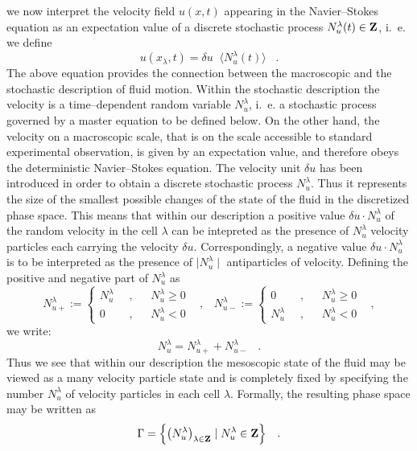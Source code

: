 we now
interpret the
velocity field $u(x,t)$ appearing in the Navier--Stokes equation
as an expectation value of a discrete stochastic process
$N_u^{\lambda}(t) \in {\bf{Z}}$, i.~e. we define
\begin{equation}
\label{EXPEC}
u(x_{\lambda},t) =
\delta u \;\; \langle N_u^{\lambda}(t) \rangle \;\;\; .
\end{equation}
The above equation provides the connection between the macroscopic
and the stochastic description of fluid motion. Within
the stochastic
description the velocity is a time--dependent random variable
$N_u^{\lambda}$,
i.~e. a stochastic process governed by a master equation to be
defined below.
On the other hand, the velocity on a macroscopic scale,
that is on the scale
accessible to standard experimental observation, is given by an
expectation
value, and therefore obeys the deterministic Navier--Stokes
equation.
The velocity unit $\delta u$ has been introduced in order to obtain
a discrete stochastic process $N_u^{\lambda}$. Thus it represents
the size
of the smallest possible changes of the state of the fluid
in the discretized
phase space. This means that within our description a positive value
$\delta u \cdot N_u^{\lambda}$ of
the random velocity in the cell ${\lambda}$ can be intepreted as
the presence
of $N_u^{\lambda}$ velocity particles each carrying the velocity
$\delta u$.
Correspondingly, a negative value $\delta u \cdot N_u^{\lambda}$
is to be
interpreted as the presence of $\mid N_u^{\lambda} \mid $
antiparticles of
velocity. Defining the positive and negative part of
$N_u^{\lambda}$ as
\begin{equation}
N_{u+}^{\lambda} := \left\{ \begin{array}{lll}
       N_u^{\lambda} \;\; &,&  \;\;\; N_u^{\lambda} \geq 0 \\
                            0 \;\; &,& \;\;\; N_u^{\lambda} < 0
                            \end{array}
                            \right. \;\;\; , \;\;\;
N_{u-}^{\lambda} := \left\{ \begin{array}{lll}
               0 \;\; &,&  \;\;\; N_u^{\lambda} \geq 0 \\
               N_u^{\lambda} \;\; &,& \;\;\; N_u^{\lambda} < 0
                            \end{array}
                            \right. \;\;\; ,
\end{equation}
we write:
\begin{equation}
N_u^{\lambda} = N_{u+}^{\lambda} + N_{u-}^{\lambda} \;\;\; .
\end{equation}
Thus we see that within our description the mesoscopic
state of the fluid may be viewed as a many velocity particle state
and is completely fixed by specifying
the number $N_u^{\lambda}$ of velocity particles in each cell
$\lambda$.
Formally, the resulting phase space may be written as
\begin{equation}
\label{PHASESPACE}
\Gamma = \left\{ \left( N_u^{\lambda} \right)_{\lambda \in {\bf{Z}}}
         \mid N_u^{\lambda} \in {\bf{Z}}
\right\} \;\;\; .
\end{equation}


